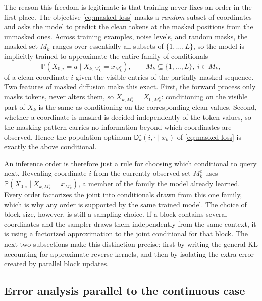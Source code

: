 \documentclass{amsart}
\numberwithin{equation}{section}
\theoremstyle{plain}
\theoremstyle{definition}
\theoremstyle{remark}
\newcommand{\Pp}{\mathbb{P}}
\newcommand{\dstar}{\mathsf{D}^{\star}}
\begin{document}
The reason this freedom is legitimate is that training never fixes an order in
the first place.  The objective \eqref{eq:masked-loss} masks a \emph{random}
subset of coordinates and asks the model to predict the clean tokens at the
masked positions from the unmasked ones.  Across training examples, noise
levels, and random masks, the masked set $M_k$ ranges over essentially all
subsets of $\{1,\ldots,L\}$, so the model is implicitly trained to approximate
the entire family of conditionals
\[
    \Pp\!\left(X_{0,i}=a \mid X_{k,M_k^c}=x_{M_k^c}\right),
    \qquad M_k\subseteq\{1,\ldots,L\},\ i\in M_k,
\]
of a clean coordinate $i$ given the visible entries of the partially masked
sequence.  Two features of masked diffusion make this exact.  First, the forward
process only masks tokens, never alters them, so
$X_{k,M_k^c}=X_{0,M_k^c}$: conditioning on the visible part of $X_k$ is the same
as conditioning on the corresponding clean values.  Second, whether a coordinate
is masked is decided independently of the token values, so the masking pattern
carries no information beyond which coordinates are observed.  Hence the
population optimum $\dstar_k(i,\cdot\mid x_k)$ of \eqref{eq:masked-loss} is
exactly the above conditional.

An inference order is therefore just a rule for choosing which conditional to
query next.  Revealing coordinate $i$ from the currently observed set $M_k^c$
uses
$\Pp(X_{0,i}\mid X_{k,M_k^c}=x_{M_k^c})$, a member of the family the model
already learned.  Every order factorizes the joint into
conditionals drawn from this one family, which is why any order is supported by
the same trained model.  The choice of block size, however, is still a sampling
choice.  If a block contains several coordinates and the sampler draws them
independently from the same context, it is using a factorized approximation to
the joint conditional for that block.  The next two subsections make this
distinction precise: first by writing the general KL accounting for approximate
reverse kernels, and then by isolating the extra error created by parallel block
updates.

\subsection{Error analysis parallel to the continuous case}
\end{document}
